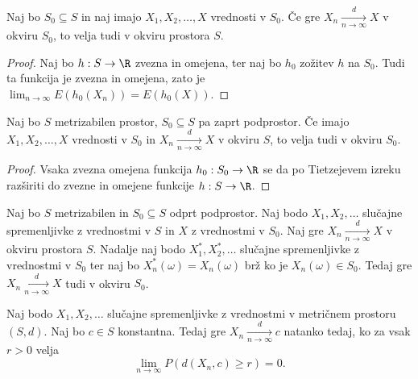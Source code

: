 \begin{trditev}
  Naj bo $S_0 \subseteq S$ in naj imajo $X_1, X_2, \ldots, X$ vrednosti v $S_0$.
  Če gre $X_n \xrightarrow[n \to \infty]{d} X$ v okviru $S_0$, to velja tudi v
  okviru prostora $S$.
\end{trditev}

\begin{proof}
  Naj bo $h: S \to \R$ zvezna in omejena, ter naj bo $h_0$ zožitev $h$ na $S_0$.
  Tudi ta funkcija je zvezna in omejena, zato je $\lim_{n \to \infty}
  E(h_0(X_n)) = E(h_0(X))$.
\end{proof}

\begin{trditev}
  Naj bo $S$ metrizabilen prostor, $S_0 \subseteq S$ pa zaprt podprostor.
  Če imajo $X_1, X_2, \ldots, X$ vrednosti v $S_0$ in $X_n \xrightarrow[n \to
  \infty]{d} X$ v okviru $S$, to velja tudi v okviru $S_0$.
\end{trditev}

\begin{proof}
  Vsaka zvezna omejena funkcija $h_0 : S_0 \to \R$ se da po Tietzejevem izreku
  razširiti do zvezne in omejene funkcije $h: S \to \R$.
\end{proof}


\begin{izrek}
  Naj bo $S$ metrizabilen in $S_0 \subseteq S$ odprt podprostor.
  Naj bodo $X_1, X_2, \ldots$ slučajne spremenljivke z vrednostmi v $S$ in $X$ z
  vrednostmi v $S_0$. Naj gre $X_n \xrightarrow[n\to\infty]{d} X$ v okviru
  prostora $S$.
  Nadalje naj bodo $X_1^*, X_2^*, \ldots$ slučajne spremenljivke z vrednostmi v
  $S_0$ ter naj bo $X_n^*(\omega) = X_n(\omega)$ brž ko je $X_n(\omega) \in
  S_0$.
  Tedaj gre $X_n \xrightarrow[n\to\infty]{d} X$ tudi v okviru $S_0$.
\end{izrek}

\begin{trditev}
  Naj bodo $X_1, X_2, \ldots$ slučajne spremenljivke z vrednostmi v metričnem
  prostoru $(S, d)$.
  Naj bo $c \in S$ konstantna.
  Tedaj gre $X_n \xrightarrow[n \to \infty]{d} c$ natanko tedaj, ko za vsak $r >
  0$ velja
  \[
	\lim_{n \to \infty} P(d(X_n,c) \ge r) = 0.
  \]
\end{trditev}

